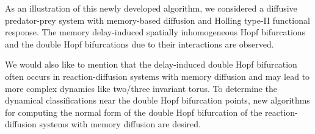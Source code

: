 \documentclass[11pt]{article}
\theoremstyle{definition}
\theoremstyle{remark}
\numberwithin{equation}{section}
\begin{document}
As an illustration of this newly developed algorithm,  we considered a  diffusive predator-prey system with memory-based diffusion and Holling type-II functional response. The memory delay-induced spatially inhomogeneous Hopf bifurcations and the double Hopf bifurcations due to their interactions  are observed.

We  would also like to mention that   the delay-induced double Hopf bifurcation often occurs  in reaction-diffusion systems with memory diffusion and may lead to more complex dynamics like two/three invariant torus.   To determine the dynamical classifications near the double Hopf bifurcation points, new algorithms for computing the normal form of the double Hopf bifurcation of the reaction-diffusion systems with memory diffusion are desired.
\end{document}
